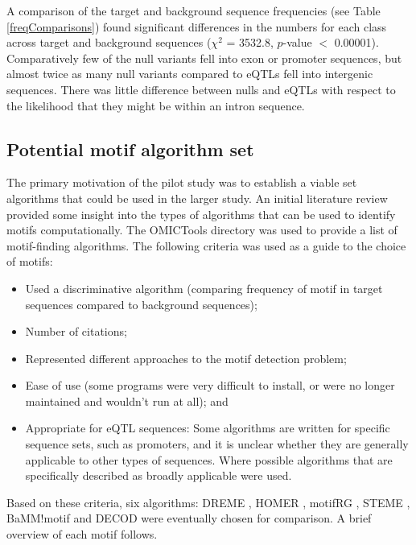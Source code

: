 \documentclass[12pt]{article}
\begin{document}
A comparison of the target and background sequence frequencies (see Table \ref{freqComparisons}) found significant differences in the numbers for each class across target and background sequences ($\chi^2$ = 3532.8, $p$-value $<$ 0.00001). Comparatively few of the null variants fell into exon or promoter sequences, but almost twice as many null variants compared to eQTLs fell into intergenic sequences. There was little difference between nulls and eQTLs with respect to the likelihood that they might be within an intron sequence.


 
\subsection{Potential motif algorithm set}

The primary motivation of the pilot study was to establish a viable set algorithms that could be used in the larger study. An initial literature review provided some insight into the types of algorithms that can be used to identify motifs computationally. The OMICTools directory \citep{henry2014omictools} was used to provide a list of motif-finding algorithms. The following criteria was used as a guide to the choice of motifs:
\begin{itemize}
\item Used a discriminative algorithm (comparing frequency of motif in target sequences compared to background sequences);
\item Number of citations;
\item Represented different approaches to the motif detection problem;
\item Ease of use (some programs were very difficult to install, or were no longer maintained and wouldn't run at all); and
\item Appropriate for eQTL sequences: Some algorithms are written for specific sequence sets, such as promoters, and it is unclear whether they are generally applicable to other types of sequences. Where possible algorithms that are specifically described as broadly applicable were used.
\end{itemize}

Based on these criteria, six algorithms: DREME \citep{bailey2011dreme}, HOMER  \citep{heinz2010simple}, motifRG \citep{yao2014discriminative}, STEME \citep{reid2011steme}, BaMM!motif \citep{siebert2016bayesian} and DECOD \citep{huggins2011decod}  were eventually chosen for comparison. A brief overview of each motif follows.
\end{document}
